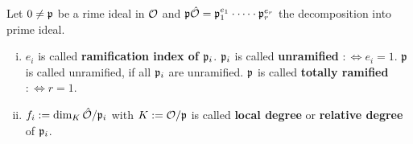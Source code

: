 \begin{defi}
	Let $0 \neq \mathfrak{p}$ be a rime ideal in $\mathcal{O}$ and $\mathfrak{p}\hat{\mathcal{O}} = \mathfrak{p}_1^{e_1} \cdot \dots \cdot \mathfrak{p}_r^{e_r}$ the decomposition into prime ideal.
	\begin{enumerate}[(i)]
		\item $e_i$ is called \textbf{ramification index of $\mathfrak{p}_i$}. $\mathfrak{p}_i$ is called \textbf{unramified} $:\Leftrightarrow e_i = 1$. $\mathfrak{p}$ is called unramified, if all $\mathfrak{p}_i$ are unramified. $\mathfrak{p}$ is called \textbf{totally ramified} $:\Leftrightarrow r = 1$. 
		
		\item $f_i : = \dim_K \hat{\mathcal{O}} / \mathfrak{p}_i$ with $K:=\mathcal{O}/\mathfrak{p}$ is called \textbf{local degree} or \textbf{relative degree} of $\mathfrak{p}_i$.
	\end{enumerate}
\end{defi}

